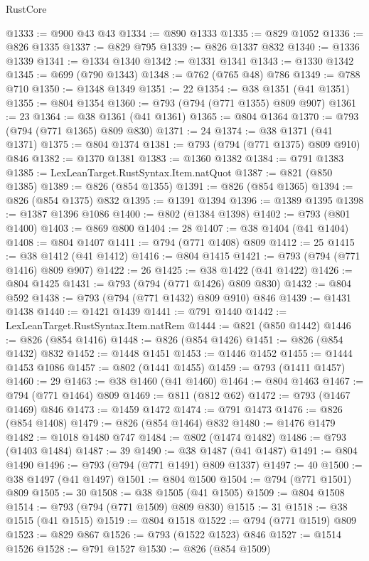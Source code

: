\begin{lexlean}{RustCore}
\begin{coremodule}
@1333 := @900 @43 @43
@1334 := @890 @1333
@1335 := @829 @1052
@1336 := @826 @1335
@1337 := @829 @795
@1339 := @826 @1337 @832
@1340 := @1336 @1339
@1341 := @1334 @1340
@1342 := @1331 @1341
@1343 := @1330 @1342
@1345 := @699 (@790 @1343)
@1348 := @762 (@765 @48) @786
@1349 := @788 @710
@1350 := @1348 @1349
@1351 := 22
@1354 := @38 @1351 (@41 @1351)
@1355 := @804 @1354
@1360 := @793 (@794 (@771 @1355) @809 @907)
@1361 := 23
@1364 := @38 @1361 (@41 @1361)
@1365 := @804 @1364
@1370 := @793 (@794 (@771 @1365) @809 @830)
@1371 := 24
@1374 := @38 @1371 (@41 @1371)
@1375 := @804 @1374
@1381 := @793 (@794 (@771 @1375) @809 @910) @846
@1382 := @1370 @1381
@1383 := @1360 @1382
@1384 := @791 @1383
@1385 := LexLeanTarget.RustSyntax.Item.natQuot
@1387 := @821 (@850 @1385)
@1389 := @826 (@854 @1355)
@1391 := @826 (@854 @1365)
@1394 := @826 (@854 @1375) @832
@1395 := @1391 @1394
@1396 := @1389 @1395
@1398 := @1387 @1396 @1086
@1400 := @802 (@1384 @1398)
@1402 := @793 (@801 @1400)
@1403 := @869 @800
@1404 := 28
@1407 := @38 @1404 (@41 @1404)
@1408 := @804 @1407
@1411 := @794 (@771 @1408) @809
@1412 := 25
@1415 := @38 @1412 (@41 @1412)
@1416 := @804 @1415
@1421 := @793 (@794 (@771 @1416) @809 @907)
@1422 := 26
@1425 := @38 @1422 (@41 @1422)
@1426 := @804 @1425
@1431 := @793 (@794 (@771 @1426) @809 @830)
@1432 := @804 @592
@1438 := @793 (@794 (@771 @1432) @809 @910) @846
@1439 := @1431 @1438
@1440 := @1421 @1439
@1441 := @791 @1440
@1442 := LexLeanTarget.RustSyntax.Item.natRem
@1444 := @821 (@850 @1442)
@1446 := @826 (@854 @1416)
@1448 := @826 (@854 @1426)
@1451 := @826 (@854 @1432) @832
@1452 := @1448 @1451
@1453 := @1446 @1452
@1455 := @1444 @1453 @1086
@1457 := @802 (@1441 @1455)
@1459 := @793 (@1411 @1457)
@1460 := 29
@1463 := @38 @1460 (@41 @1460)
@1464 := @804 @1463
@1467 := @794 (@771 @1464) @809
@1469 := @811 (@812 @62)
@1472 := @793 (@1467 @1469) @846
@1473 := @1459 @1472
@1474 := @791 @1473
@1476 := @826 (@854 @1408)
@1479 := @826 (@854 @1464) @832
@1480 := @1476 @1479
@1482 := @1018 @1480 @747
@1484 := @802 (@1474 @1482)
@1486 := @793 (@1403 @1484)
@1487 := 39
@1490 := @38 @1487 (@41 @1487)
@1491 := @804 @1490
@1496 := @793 (@794 (@771 @1491) @809 @1337)
@1497 := 40
@1500 := @38 @1497 (@41 @1497)
@1501 := @804 @1500
@1504 := @794 (@771 @1501) @809
@1505 := 30
@1508 := @38 @1505 (@41 @1505)
@1509 := @804 @1508
@1514 := @793 (@794 (@771 @1509) @809 @830)
@1515 := 31
@1518 := @38 @1515 (@41 @1515)
@1519 := @804 @1518
@1522 := @794 (@771 @1519) @809
@1523 := @829 @867
@1526 := @793 (@1522 @1523) @846
@1527 := @1514 @1526
@1528 := @791 @1527
@1530 := @826 (@854 @1509)

\end{coremodule}
\end{lexlean}

